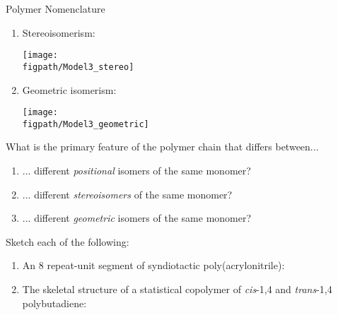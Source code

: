 \begin{activity}{Polymer Nomenclature}
\begin{model}[Isomerism]
\begin{enumerate}
		\item Stereoisomerism:
		
			\centerline{\texttt{[image: \\figpath/Model3\_stereo]}}
		
		\item Geometric isomerism:
		
		\vspace{4pt}	\centerline{\texttt{[image: \\figpath/Model3\_geometric]}}
		
	\end{enumerate}

\end{model}

\begin{ctqs}

	\question What is the primary feature of the polymer chain that differs between...
	
		\begin{enumerate}
			\item ... different \emph{positional} isomers of the same monomer?
			
				\begin{solution}[0.5in]
				\end{solution}
			
			\item ... different \emph{stereoisomers} of the same monomer?
			
				\begin{solution}[0.5in]
				\end{solution}
			
			\item ... different \emph{geometric} isomers of the same monomer?
			
				\begin{solution}[0.5in]
				\end{solution}
			
		\end{enumerate}
		
	\question Sketch each of the following:
	
		\begin{enumerate}
			\item An 8 repeat-unit segment of syndiotactic poly(acrylonitrile):
			
				\begin{solution}[1in]
				\end{solution}
			
			\item The skeletal structure of a statistical copolymer of \emph{cis}-1,4 and \emph{trans}-1,4 polybutadiene:
			

\end{enumerate}
\end{ctqs}
\end{activity}
